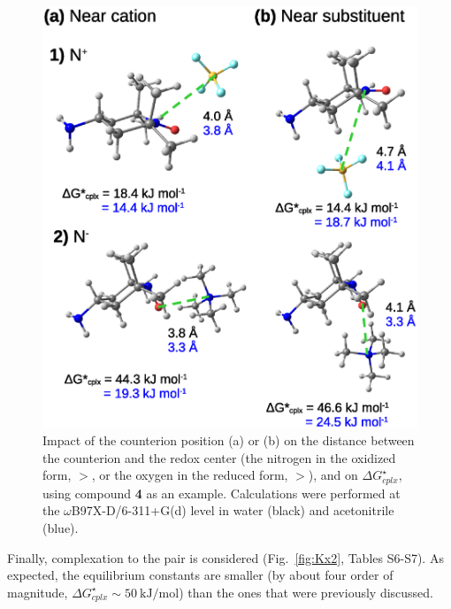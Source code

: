 \documentclass[review]{elsarticle}
\begin{document}
\begin{figure}[!h]
	\centering
	\includegraphics[width=.7\linewidth]{Figure12}
	\caption{Impact of the counterion position (a) or (b) on the distance between the counterion and the redox center (the nitrogen in the oxidized form, $>$, or the oxygen in the reduced form, $>$), and on $\Delta G^\star_{cplx}$, using compound \textbf{4} as an example. Calculations were performed at the $\omega$B97X-D/6-311+G(d) level in water (black) and acetonitrile (blue).}
	\label{fig:pos-anion}
\end{figure}


Finally, complexation to the  pair is considered (Fig.~\ref{fig:Kx2}, Tables S6-S7). As expected, the equilibrium constants are smaller (by about four order of magnitude, $\Delta G^\star_{cplx} \sim \SI{50}{\kilo\joule\per\mole}$) than the ones that were previously discussed.
\end{document}
